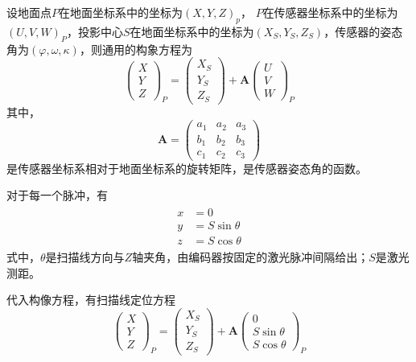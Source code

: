 设地面点$ P $在地面坐标系中的坐标为$ (X,Y,Z)_p $， $ P $在传感器坐标系中的坐标为$ (U,V,W)_P $，投影中心$ S $在地面坐标系中的坐标为$ (X_S,Y_S,Z_S) $，传感器的姿态角为$ (\varphi,\omega,\kappa) $，则通用的构象方程为
\begin{equation}
\begin{pmatrix}
X \\ Y \\ Z
\end{pmatrix}_P = \begin{pmatrix}
X_S \\ Y_S \\ Z_S
\end{pmatrix} + \symbf{A} \begin{pmatrix}
U \\ V \\ W
\end{pmatrix}_P
\end{equation}
其中，
\begin{equation}
\symbf{A} = \begin{pmatrix}
a_1 & a_2 & a_3 \\
b_1 & b_2 & b_3 \\
c_1 & c_2 & c_3 
\end{pmatrix}
\end{equation}
是传感器坐标系相对于地面坐标系的旋转矩阵，是传感器姿态角的函数。

对于每一个脉冲，有
\begin{align}
	\begin{split}
	x & = 0 \\
	y & = S \sin \theta \\
	z & = S \cos \theta
	\end{split}
\end{align}
式中，$ \theta $是扫描线方向与$ Z $轴夹角，由编码器按固定的激光脉冲间隔给出；$ S $是激光测距。

代入构像方程，有扫描线定位方程
\begin{equation}
\begin{pmatrix}
X \\ Y \\ Z
\end{pmatrix}_P = \begin{pmatrix}
X_S \\ Y_S \\ Z_S
\end{pmatrix} + \symbf{A} \begin{pmatrix}
0 \\ S\sin\theta \\ S\cos\theta
\end{pmatrix}_P
\end{equation}

